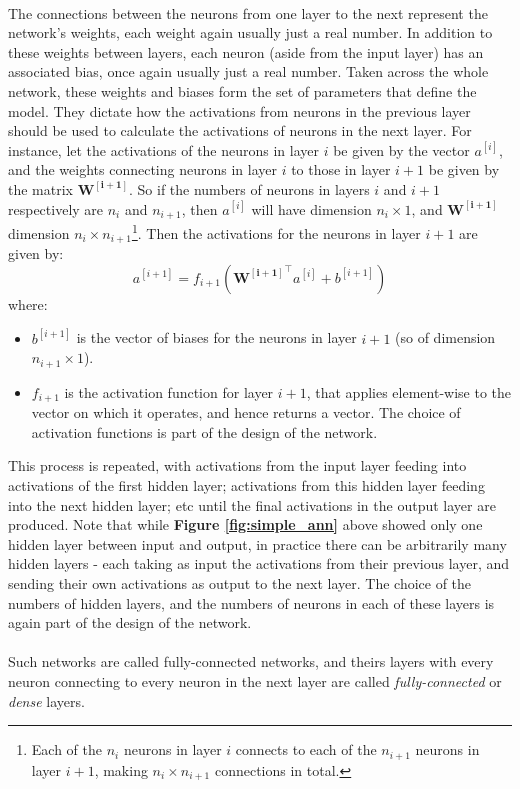 \documentclass[11pt]{article} %
\theoremstyle{plain}
\theoremstyle{definition}
\begin{document}
\\
\noindent
The connections between the neurons from one layer to the next represent the network's weights, each weight again usually just a real number. In addition to these weights between layers, each neuron (aside from the input layer) has an associated bias, once again usually just a real number. Taken across the whole network, these weights and biases form the set of parameters that define the model. They dictate how the activations from neurons in the previous layer should be used to calculate the activations of neurons in the next layer. For instance, let the activations of the neurons in layer \(i\) be given by the vector \(a^{[i]}\), and the weights connecting neurons in layer \(i\) to those in layer \(i+1\) be given by the matrix \(\mathbf{W^{[i+1]}}\). So if the numbers of neurons in layers \(i\) and \(i+1\) respectively are \(n_i\) and \(n_{i+1}\), then \(a^{[i]}\) will have dimension \(n_i \times 1\), and \(\mathbf{W^{[i+1]}}\) dimension \(n_i \times n_{i+1}\)\footnote{Each of the \(n_i\) neurons in layer \(i\) connects to each of the \(n_{i+1}\) neurons in layer \(i+1\), making \({n_i} \times n_{i+1}\) connections in total.}. Then the activations for the neurons in layer \(i+1\) are given by:
\[a^{[i+1]} = f_{i+1}(\mathbf{{W^{[i+1]}}^{\top}}a^{[i]} + b^{[i+1]}) \]
where:
\begin{itemize}
  \item \(b^{[i+1]}\) is the vector of biases for the neurons in layer \(i+1\) (so of dimension \(n_{i+1} \times 1\)). 
  \item \(f_{i+1}\) is the activation function for layer \(i+1\), that applies element-wise to the vector on which it operates, and hence returns a vector. The choice of activation functions is part of the design of the network.   
\end{itemize}
This process is repeated, with activations from the input layer feeding into activations of the first hidden layer; activations from this hidden layer feeding into the next hidden layer; etc until the final activations in the output layer are produced. Note that while \textbf{Figure \ref{fig:simple_ann}} above showed only one hidden layer between input and output, in practice there can be arbitrarily many hidden layers - each taking as input the activations from their previous layer, and sending their own activations as output to the next layer. The choice of the numbers of hidden layers, and the numbers of neurons in each of these layers is again part of the design of the network. 
\\
\\
\noindent
Such networks are called fully-connected networks, and theirs layers with every neuron connecting to every neuron in the next layer are called \textit{fully-connected} or \textit{dense} layers.   
\end{document}
